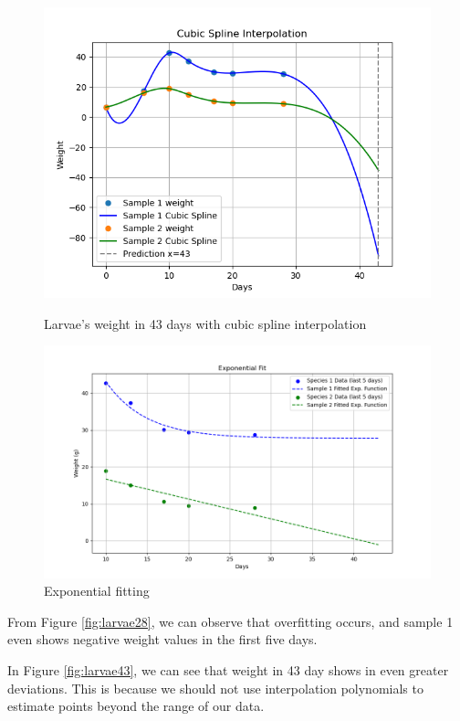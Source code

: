 \documentclass[a4paper]{article}
\begin{document}
\begin{figure}[ht]
\begin{minipage}[b]{0.45\textwidth}
    \centering
    \includegraphics[width=\textwidth]{figures/cubicspline.png}
    \caption{Larvae's weight in 43 days with cubic spline interpolation}
    \label{fig:larvaeCubicSpline}
  \end{minipage}
  \hfill
  \begin{minipage}[b]{0.45\textwidth}
    \centering
    \includegraphics[width=\textwidth]{figures/expfit.png}
    \caption{Exponential fitting}
    \label{fig:expfit}
  \end{minipage}
\end{figure}

From Figure \ref{fig:larvae28}, we can observe that overfitting occurs, and sample 1 even shows negative weight values in the first five days.

In Figure \ref{fig:larvae43}, we can see that weight in 43 day shows in even greater deviations. This is because we should not use interpolation polynomials to estimate points beyond the range of our data.
\end{document}
